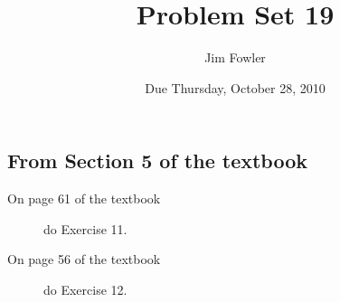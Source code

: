 \documentclass[12pt]{handout}
\author{Jim Fowler}
\title{Problem Set 19}
\date{Due Thursday, October 28, 2010}
\begin{document}
\maketitle










\subsection*{From Section 5 of the textbook}



\begin{description}

\item[On page 61 of the textbook] do Exercise 11.

\item[On page 56 of the textbook] do Exercise 12.

\end{description}
\end{document}
